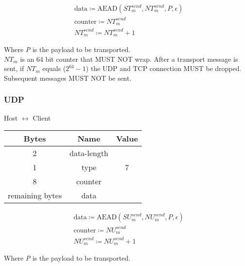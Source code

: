 \begin{align*}
    & \text{data} \coloneqq \text{AEAD}(\mathit{ST}_{m}^{send},\mathit{NT}_{m}^{send}, P, \epsilon)\\
    & \text{counter} \coloneqq \mathit{NT}_{m}^{send}\\
    & \mathit{NT}_{m}^{send} \coloneqq \mathit{NT}_{m}^{send} + 1
\end{align*}


Where \emph{P} is the payload to be transported.\\

$\mathit{NT}_{m}$ is an 64 bit counter that MUST NOT wrap. After a transport message is sent, if $\mathit{NT}_{m}$ equals
($2^{64}-1$) the UDP and TCP connection MUST be dropped. Subsequent messages MUST NOT be sent. \\

\subsubsection{UDP}

\begin{center}
    Host $\leftrightarrow$ Client\\
    \begin{tabular}{|c|c|c|}
        \hline
        \textbf{Bytes}  & \textbf{Name} & \textbf{Value} \\
        \hline
        2               & data-length   &                \\
        \hline
        1               & type          & 7              \\
        \hline
        8               & counter       &                \\
        \hline
        remaining bytes & data          &                \\
        \hline
    \end{tabular}
\end{center}

\begin{align*}
    & \text{data} \coloneqq \text{AEAD}(\mathit{SU}_{m}^{send},\mathit{NU}_{m}^{send}, P, \epsilon)\\
    & \text{counter} \coloneqq \mathit{NU}_{m}^{send}\\
    & \mathit{NU}_{m}^{send} \coloneqq \mathit{NU}_{m}^{send} + 1
\end{align*}


Where \emph{P} is the payload to be transported.\\

